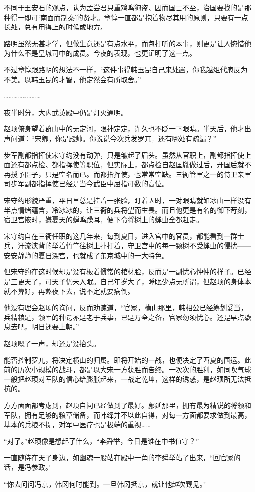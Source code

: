 不同于王安石的观点，认为孟尝君只重鸡鸣狗盗、因而国士不至，治国要找的是那种得一即可‘南面而制秦’的贤才。章惇一直都是抱着物尽其用的原则，只要有一点长处，总有用得上的时候或地方。

路明虽然无甚才学，但做生意还是有点水平，而包打听的本事，则更是让人惋惜他为什么不是皇城司中的成员。今夜的表现，也更证明了这一点。

不过章惇跟路明的想法不一样，“这件事得韩玉昆自己来处置，你我越俎代庖反为不美。以韩玉昆的才智，他定然会有所取舍。”

……………………

夜半时分，大内武英殿中仍是灯火通明。

赵顼俯身望着群山中的无定河，眼神定定，许久也不眨一下眼睛。半天后，他才出声问道：“宋卿，你是殿帅。你说说今次兵发罗兀，还有哪处有疏漏？”

步军副都指挥使宋守约没有动弹，只是皱起了眉头。虽然从官职上，副都指挥使上面还有都点检、都指挥使等职位，但实际上，都点检自赵匡胤做过后，开国后就不再授予臣子，只是空名而已。而都指挥使，也常常空缺。三衙管军之一的侍卫亲军司步军副都指挥使已经是当今武臣中屈指可数的高位。

宋守约形貌严重，平日里总是挂着一张脸，盯着人时，一对眼睛就如冰山一样没有半点情绪蕴含，冷冰冰的，让三衙的兵将望而生畏。而且他更是有名的御下苛刻，宿卫宫掖时，嫌夏天的蝉鸣躁耳，便下令将树上的蝉虫全都赶走。

宋守约自在三衙任职的这几年来，每到夏日，进入宫中的官员，都能看到一群士兵，汗流浃背的举着竹竿往树上扑打着，守卫宫中的每一颗树不受蝉虫的侵扰——安安静静的夏日深宫，也就成了东京城中的一大特色。

但宋守约在这时候却是没有板着惯常的棺材脸，反而是一副忧心忡忡的样子。已经是三更天了，可天子仍未入眠。自己年岁大了，睡眠少点无所谓，但赵顼的身体本就不算好，再熬夜下去，说不定就要病倒。

他没有理会赵顼的询问，反而劝谏道，“官家，横山那里，韩相公已经筹划妥当，兵精粮足，领军的种谔亦是老于兵事，已是万全之备，官家勿须忧心。还是早点歇息去吧，明日还要上朝。”

赵顼嗯了一声，却还是没抬头。

能否控制罗兀，将决定横山的归属。即将开始的一战，也便决定了西夏的国运。此前的历次小规模的战斗，都是以大宋一方获胜而告终。一次次的胜利，如同吹气球一般把赵顼对军队的信心给膨胀起来，一战定乾坤，这样的诱惑，是赵顼所无法抵抗的。

方方面面都考虑到，赵顼自问已经做到了最好。鄜延那里，拥有最为精锐的将领和军队，拥有足够的粮草储备，而韩绛并不以此自得，对每一方面都要求做到最高，基本的兵粮不提，对军中医疗也是极端的重视……

“对了。”赵顼像是想起了什么，“李舜举，今日是谁在中书值守？”

一直随侍在天子身边，如幽魂一般站在殿中一角的李舜举站了出来，“回官家的话，是冯参政。”

“你去问问冯京，韩冈何时能到。一旦韩冈抵京，就让他越次觐见。”

